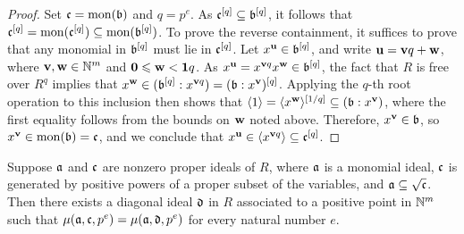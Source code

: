 \documentclass{amsart}
\begin{document}
\begin{proof}
   Set $\mathfrak{c} = \operatorname{mon}(\mathfrak{b})$ and $q=p^e$.
   As $\mathfrak{c}^{[q]} \subseteq \mathfrak{b}^{[q]}$, it follows that $\mathfrak{c}^{[q]} = \operatorname{mon}(\mathfrak{c}^{[q]}) \subseteq \operatorname{mon}(\mathfrak{b}^{[q]})$.
   To prove the reverse containment, it suffices to prove that any monomial in $\mathfrak{b}^{[q]}$ must lie in $\mathfrak{c}^{[q]}$.
   Let $x^{\mathbf{u}} \in \mathfrak{b}^{[q]}$, and write $\mathbf{u} = \mathbf{v}q + \mathbf{w}$, where $\mathbf{v}, \mathbf{w} \in \mathbb{N}^m$ and $\mathbf{0} \leqslant \mathbf{w} < \mathbf{1}q$.
   As $x^{\mathbf{u}} = x^{\mathbf{v}q} x^{\mathbf{w}} \in \mathfrak{b}^{[q]}$, the fact that $R$ is free over $R^q$ implies that $x^{\mathbf{w}} \in ( \mathfrak{b}^{[q]}: x^{\mathbf{v}q}) = (\mathfrak{b}:x^{\mathbf{v}})^{[q]}$.
   Applying the $q$-th root operation to this inclusion then shows that $\langle 1 \rangle = \langle x^{\mathbf{w}} \rangle^{[1/q]}  \subseteq (\mathfrak{b}: x^{\mathbf{v}})$,  where the first equality follows from the bounds on $\mathbf{w}$ noted above.
   Therefore, $x^{\mathbf{v}} \in \mathfrak{b}$, so $x^{\mathbf{v}} \in \operatorname{mon}(\mathfrak{b}) = \mathfrak{c}$, and we conclude that $x^{\mathbf{u}} \in \langle x^{\mathbf{v}q} \rangle \subseteq \mathfrak{c}^{[q]}$.
\end{proof}


\begin{lemma}
   \label{quasi-diagonal to diagonal: L}
   Suppose $\mathfrak{a}$ and $\mathfrak{c}$ are nonzero proper ideals of $R$, where $\mathfrak{a}$ is a monomial ideal, $\mathfrak{c}$ is generated by positive powers of a proper subset of the variables, and $\mathfrak{a} \subseteq \sqrt{\mathfrak{c}}$.
   Then there exists a diagonal ideal $\mathfrak{d}$ in $R$ associated to a positive point in $\mathbb{N}^m$ such that $\mu(\mathfrak{a}, \mathfrak{c}, p^e) = \mu(\mathfrak{a}, \mathfrak{d}, p^e)$ for every natural number $e$.
\end{lemma}
\end{document}
